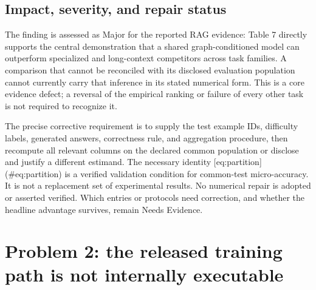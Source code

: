 \documentclass[10pt]{article}
\begin{document}
\subsection*{Impact, severity, and repair status}
The finding is assessed as Major for the reported RAG evidence: Table 7 directly supports the central demonstration that a shared graph-conditioned model can outperform specialized and long-context competitors across task families. A comparison that cannot be reconciled with its disclosed evaluation population cannot currently carry that inference in its stated numerical form. This is a core evidence defect; a reversal of the empirical ranking or failure of every other task is not required to recognize it.\par
The precise corrective requirement is to supply the test example IDs, difficulty labels, generated answers, correctness rule, and aggregation procedure, then recompute all relevant columns on the declared common population or disclose and justify a different estimand. The necessary identity [eq:partition] (\#eq:partition) is a verified validation condition for common-test micro-accuracy. It is not a replacement set of experimental results. No numerical repair is adopted or asserted verified. Which entries or protocols need correction, and whether the headline advantage survives, remain Needs Evidence.\par
\section*{Problem 2: the released training path is not internally executable}
\end{document}
